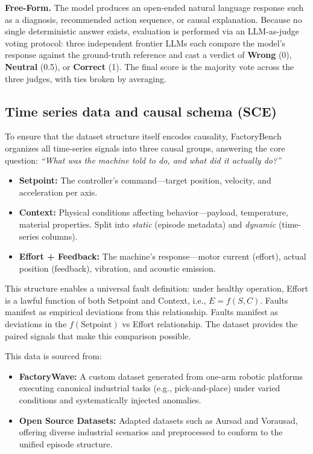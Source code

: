 \documentclass{article}
\begin{document}
\textbf{Free-Form.} The model produces an open-ended natural language response such as a diagnosis, recommended action sequence, or causal explanation. Because no single deterministic answer exists, evaluation is performed via an LLM-as-judge voting protocol: three independent frontier LLMs each compare the model's response against the ground-truth reference and cast a verdict of \textbf{Wrong} (0), \textbf{Neutral} (0.5), or \textbf{Correct} (1). The final score is the majority vote across the three judges, with ties broken by averaging.

\subsection{Time series data and causal schema (SCE)}

To ensure that the dataset structure itself encodes causality, FactoryBench organizes all time-series signals into three causal groups, answering the core question: \textit{``What was the machine told to do, and what did it actually do?''}

\begin{itemize}
    \item \textbf{Setpoint:} The controller's command---target position, velocity, and acceleration per axis.
    \item \textbf{Context:} Physical conditions affecting behavior---payload, temperature, material properties. Split into \textit{static} (episode metadata) and \textit{dynamic} (time-series columns).
    \item \textbf{Effort + Feedback:} The machine's response---motor current (effort), actual position (feedback), vibration, and acoustic emission.
\end{itemize}

This structure enables a universal fault definition: under healthy operation, Effort is a lawful function of both Setpoint and Context, i.e., $E = f(S, C)$. Faults manifest as empirical deviations from this relationship. Faults manifest as deviations in the $f(\text{Setpoint})$ vs Effort relationship. The dataset provides the paired signals that make this comparison possible.

This data is sourced from:

\begin{itemize}
    \item \textbf{FactoryWave:} A custom dataset generated from one-arm robotic platforms executing canonical industrial tasks (e.g., pick-and-place) under varied conditions and systematically injected anomalies.
    \item \textbf{Open Source Datasets:} Adapted datasets such as Aursad and Vorausad, offering diverse industrial scenarios and preprocessed to conform to the unified episode structure.
\end{itemize}
\end{document}
